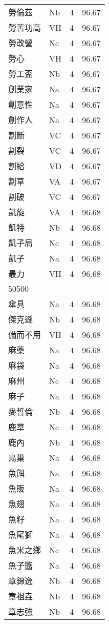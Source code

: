 \documentclass[twocolumn]{book}
\begin{document}
\begin{supertabular}{llrr}
勞倫茲 & Nb & 4 &  96.67\\
勞苦功高 & VH & 4 &  96.67\\
勞改營 & Nc & 4 &  96.67\\
勞心 & VH & 4 &  96.67\\
勞工盃 & Nb & 4 &  96.67\\
創業家 & Na & 4 &  96.67\\
創意性 & Na & 4 &  96.67\\
創作人 & Na & 4 &  96.67\\
割斷 & VC & 4 &  96.67\\
割裂 & VC & 4 &  96.67\\
割給 & VD & 4 &  96.67\\
割草 & VA & 4 &  96.67\\
割破 & VC & 4 &  96.67\\
凱旋 & VA & 4 &  96.68\\
凱特 & Nb & 4 &  96.68\\
凱子局 & Nc & 4 &  96.68\\
凱子 & Na & 4 &  96.68\\
最力 & VH & 4 &  96.68\\
50500\\
傘具 & Na & 4 &  96.68\\
傑克遜 & Nb & 4 &  96.68\\
備而不用 & VH & 4 &  96.68\\
麻藥 & Na & 4 &  96.68\\
麻袋 & Na & 4 &  96.68\\
麻州 & Nc & 4 &  96.68\\
麻子 & Na & 4 &  96.68\\
麥哲倫 & Nb & 4 &  96.68\\
鹿草 & Nc & 4 &  96.68\\
鹿內 & Nb & 4 &  96.68\\
鳥巢 & Na & 4 &  96.68\\
魚餌 & Na & 4 &  96.68\\
魚販 & Na & 4 &  96.68\\
魚翅 & Na & 4 &  96.68\\
魚籽 & Na & 4 &  96.68\\
魚尾獅 & Na & 4 &  96.68\\
魚米之鄉 & Nc & 4 &  96.68\\
魚子醬 & Na & 4 &  96.68\\
章錦逸 & Nb & 4 &  96.68\\
章祖垚 & Nb & 4 &  96.68\\
章志強 & Nb & 4 &  96.68\\

\end{supertabular}
\end{document}
